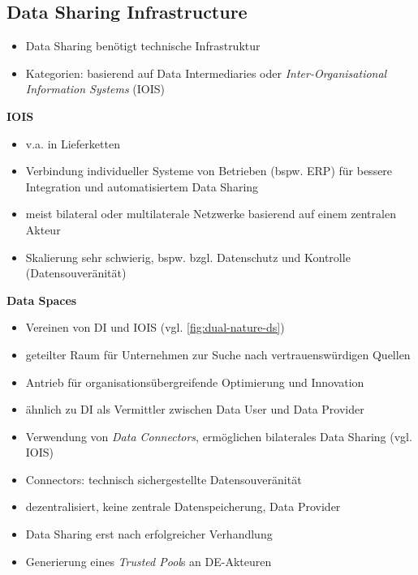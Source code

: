 \subsection{Data Sharing Infrastructure}

\begin{itemize}
    \item Data Sharing benötigt technische Infrastruktur
    \item Kategorien: basierend auf Data Intermediaries oder \emph{Inter-Organisational Information Systems} (IOIS)
\end{itemize}

\vspace{1cm}

\textbf{IOIS}
\begin{itemize}
    \item v.a. in Lieferketten
    \item Verbindung individueller Systeme von Betrieben (bspw. ERP) für bessere Integration und automatisiertem Data Sharing
    \item meist bilateral oder multilaterale Netzwerke basierend auf einem zentralen Akteur
    \item Skalierung sehr schwierig, bspw. bzgl. Datenschutz und Kontrolle (Datensouveränität)
\end{itemize}

\vspace{1cm}

\textbf{Data Spaces}
\begin{itemize}
    \item Vereinen von DI und IOIS (vgl. \autoref{fig:dual-nature-ds})
    \item geteilter Raum für Unternehmen zur Suche nach vertrauenswürdigen Quellen
    \item Antrieb für organisationsübergreifende Optimierung und Innovation
    \item ähnlich zu DI als Vermittler zwischen Data User und Data Provider
    \item Verwendung von \emph{Data Connectors}, ermöglichen bilaterales Data Sharing (vgl. IOIS)
    \item Connectors: technisch sichergestellte Datensouveränität
    \item dezentralisiert, keine zentrale Datenspeicherung, Data Provider
    \item Data Sharing erst nach erfolgreicher Verhandlung
    \item Generierung eines \emph{Trusted Pool}s an DE-Akteuren~\cite{mollerIndustrialDataEcosystems2024}
\end{itemize}

